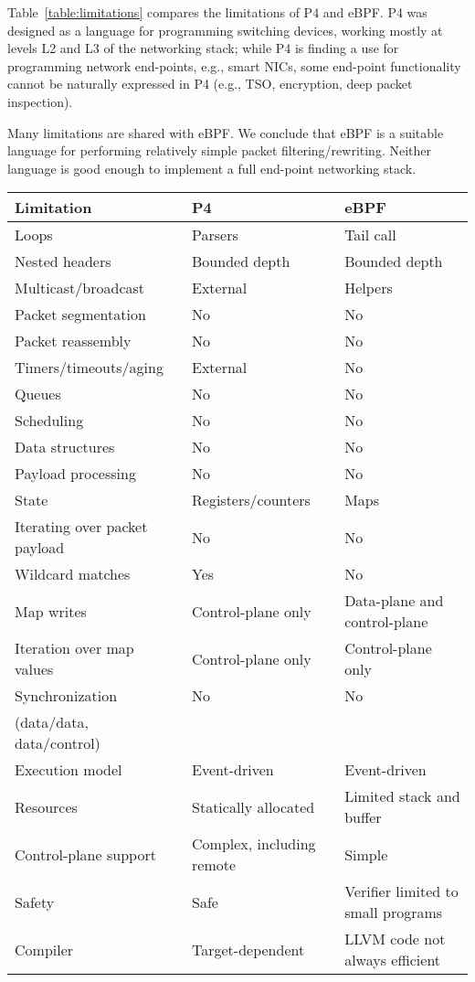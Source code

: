 Table~\ref{table:limitations} compares the limitations of P4 and eBPF.
P4 was designed as a language for programming switching devices,
working mostly at levels L2 and L3 of the networking stack; while P4
is finding a use for programming network end-points, e.g., smart NICs,
some end-point functionality cannot be naturally expressed in P4
(e.g., TSO, encryption, deep packet inspection).

Many limitations are shared with eBPF.  We conclude that eBPF is a
suitable language for performing relatively simple packet
filtering/rewriting.  Neither language is good enough to implement a
full end-point networking stack.

\begin{table*}[h]
  \footnotesize
  \begin{center}
  \begin{tabular}{|l|l|l|} \hline
    \textbf{Limitation} & \textbf{P4} & \textbf{eBPF} \\ \hline \hline
    Loops & Parsers & Tail call \\ \hline
    Nested headers & Bounded depth & Bounded depth \\ \hline
    Multicast/broadcast & External & Helpers \\ \hline
    Packet segmentation & No & No \\ \hline
    Packet reassembly &	No & No \\ \hline
    Timers/timeouts/aging & External & No \\ \hline
    Queues & No & No \\ \hline
    Scheduling & No & No \\ \hline
    Data structures & No & No \\ \hline
    Payload processing & No & No \\ \hline
    State & Registers/counters & Maps \\ \hline
    Iterating over packet payload & No & No \\ \hline
    Wildcard matches & Yes & No \\ \hline
    Map writes & Control-plane only & Data-plane and control-plane \\ \hline
    Iteration over map values & Control-plane only & Control-plane only \\ \hline
    Synchronization & No & No \\
    (data/data, data/control) & & \\ \hline
    Execution model & Event-driven & Event-driven \\ \hline
    Resources & Statically allocated & Limited stack and buffer \\ \hline
    Control-plane support & Complex, including remote & Simple \\ \hline
    Safety & Safe & Verifier limited to small programs \\ \hline
    Compiler & Target-dependent & LLVM code not always efficient \\ \hline
  \end{tabular}
  \caption{Limitations comparison between P4 and eBPF.}\label{table:limitations}
  \end{center}
\end{table*}
